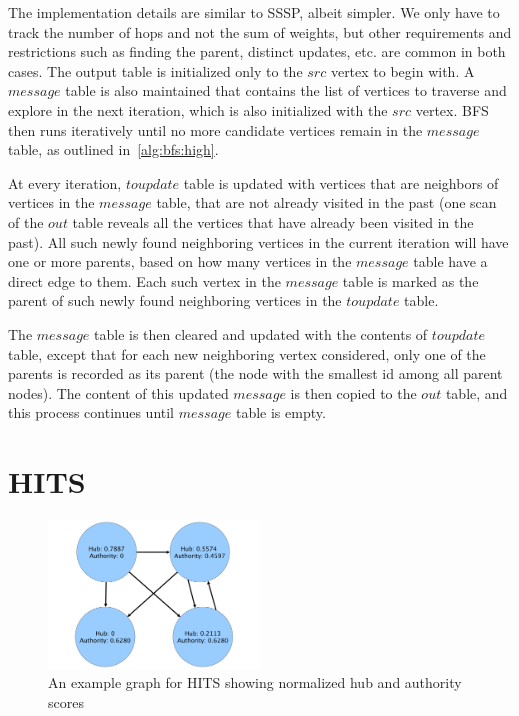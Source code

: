 The implementation details are similar to SSSP, albeit simpler. We only have to
track the number of hops and not the sum of weights, but other requirements and
restrictions such as finding the parent, distinct updates, etc. are common in
both cases. The output table is initialized only to the $src$ vertex to begin
with. A $message$ table is also maintained that contains the list of vertices
to traverse and explore in the next iteration, which is also initialized with
the $src$ vertex. BFS then runs iteratively until no more candidate vertices
remain in the $message$ table, as outlined in~\ref{alg:bfs:high}.

At every iteration, $toupdate$ table is updated with vertices that are neighbors
of vertices in the $message$ table, that are not already visited in the past
(one scan of the $out$ table reveals all the vertices that have already been
visited in the past). All such newly found neighboring vertices in the current
iteration will have one or more parents, based on how many vertices in the
$message$ table have a direct edge to them. Each such vertex in the $message$
table is marked as the parent of such newly found neighboring vertices in
the $toupdate$ table.

The $message$ table is then cleared and updated with the contents of $toupdate$
table, except that for each new neighboring vertex considered, only one of the
parents is recorded as its parent (the node with the smallest id among all
parent nodes). The content of this updated $message$ is then copied
to the $out$ table, and this process continues until $message$ table is empty.


\section{HITS} \label{sec:graph:hits}
\begin{figure}[h]
	\centering
	\includegraphics[width=0.5\textwidth]{figures/hits_example.pdf}
\caption{An example graph for HITS showing normalized hub and authority scores}
\label{hits:example}
\end{figure}

